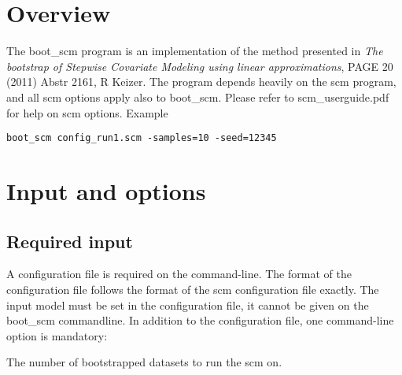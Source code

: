 



\maketitle


\section{Overview}

The boot\_scm program is an implementation of the method presented in
\emph{The bootstrap of Stepwise Covariate Modeling using linear approximations},
PAGE 20 (2011) Abstr 2161, R Keizer.
The program depends heavily on the scm program, and all scm options apply also to boot\_scm. Please refer to scm\_userguide.pdf for help on scm options.
Example
\begin{verbatim}
boot_scm config_run1.scm -samples=10 -seed=12345
\end{verbatim}

\section{Input and options}
\subsection{Required input}
A configuration file is required on the command-line. The format of the configuration file follows the format of the scm configuration file exactly. The input model must be set in the configuration file, it cannot be given on the boot\_scm commandline. In addition to the configuration file, one command-line option is mandatory:
\begin{optionlist}
The number of bootstrapped datasets to run the scm on. 
\nextopt
\end{optionlist}

